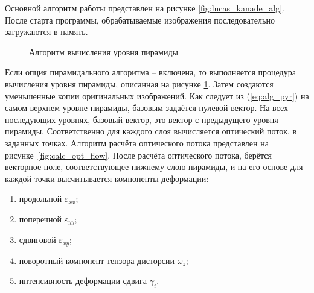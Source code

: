 Основной алгоритм работы представлен на рисунке \ref{fig:lucas_kanade_alg}. После старта программы, обрабатываемые изображения последовательно загружаются в память.
\begin{figure}[h!]
\caption{Алгоритм вычисления уровня пирамиды}
\label{fig:calc_pyr}
\end{figure}
Если опция пирамидального алгоритма -- включена, то выполняется процедура вычисления уровня пирамиды, описанная на рисунке \ref{fig:calc_pyr}. Затем создаются уменьшенные копии оригинальных изображений.
Как следует из (\ref{eq:alg_pyr}) на самом верхнем уровне пирамиды, базовым задаётся нулевой вектор. На всех последующих уровнях, базовый вектор, это вектор с предыдущего уровня пирамиды.
Соответственно для каждого слоя вычисляется оптический поток, в заданных точках. Алгоритм расчёта оптического потока представлен на рисунке~\ref{fig:calc_opt_flow}. 
После расчёта оптического потока, берётся векторное поле, соответствующее нижнему слою пирамиды, и на его основе для каждой точки высчитывается компоненты деформации:
\begin{enumerate}
\item продольной $\varepsilon_{xx}$;
\item поперечной $\varepsilon_{yy}$;
\item сдвиговой $\varepsilon_{xy}$;
\item поворотный компонент тензора дисторсии $\omega_z$;
\item интенсивность деформации сдвига $\gamma_i$.
\end{enumerate}

